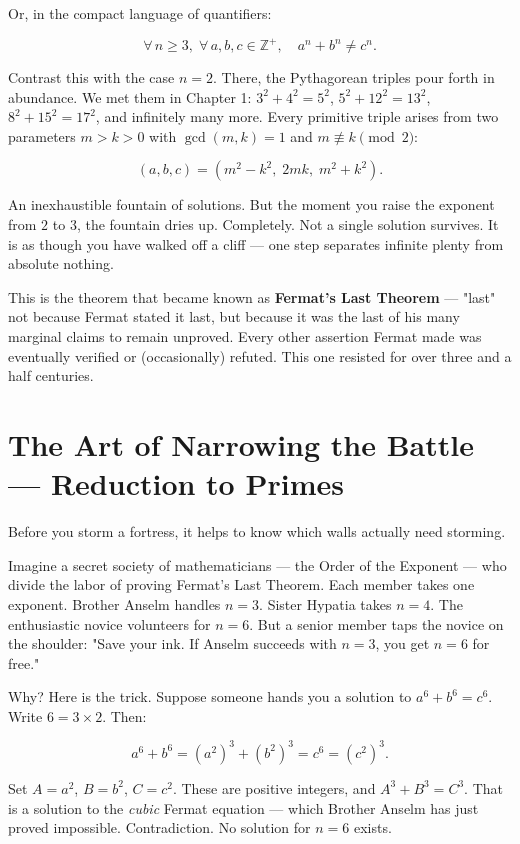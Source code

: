 Or, in the compact language of quantifiers:

\[
\forall\, n \ge 3,\; \forall\, a, b, c \in \mathbb{Z}^+, \quad a^n + b^n \neq c^n.
\]

Contrast this with the case $n = 2$. There, the Pythagorean triples pour forth in abundance. We met them in Chapter 1: $3^2 + 4^2 = 5^2$, $5^2 + 12^2 = 13^2$, $8^2 + 15^2 = 17^2$, and infinitely many more. Every primitive triple arises from two parameters $m > k > 0$ with $\gcd(m, k) = 1$ and $m \not\equiv k \pmod{2}$:

\[
(a, b, c) = (m^2 - k^2,\; 2mk,\; m^2 + k^2).
\]

An inexhaustible fountain of solutions. But the moment you raise the exponent from $2$ to $3$, the fountain dries up. Completely. Not a single solution survives. It is as though you have walked off a cliff --- one step separates infinite plenty from absolute nothing.

This is the theorem that became known as \textbf{Fermat's Last Theorem} --- "last" not because Fermat stated it last, but because it was the last of his many marginal claims to remain unproved. Every other assertion Fermat made was eventually verified or (occasionally) refuted. This one resisted for over three and a half centuries.

\bigskip

\section*{The Art of Narrowing the Battle --- Reduction to Primes}

Before you storm a fortress, it helps to know which walls actually need storming.

Imagine a secret society of mathematicians --- the Order of the Exponent --- who divide the labor of proving Fermat's Last Theorem. Each member takes one exponent. Brother Anselm handles $n = 3$. Sister Hypatia takes $n = 4$. The enthusiastic novice volunteers for $n = 6$. But a senior member taps the novice on the shoulder: "Save your ink. If Anselm succeeds with $n = 3$, you get $n = 6$ for free."

Why? Here is the trick. Suppose someone hands you a solution to $a^6 + b^6 = c^6$. Write $6 = 3 \times 2$. Then:

\[
a^6 + b^6 = (a^2)^3 + (b^2)^3 = c^6 = (c^2)^3.
\]

Set $A = a^2$, $B = b^2$, $C = c^2$. These are positive integers, and $A^3 + B^3 = C^3$. That is a solution to the \textit{cubic} Fermat equation --- which Brother Anselm has just proved impossible. Contradiction. No solution for $n = 6$ exists.

